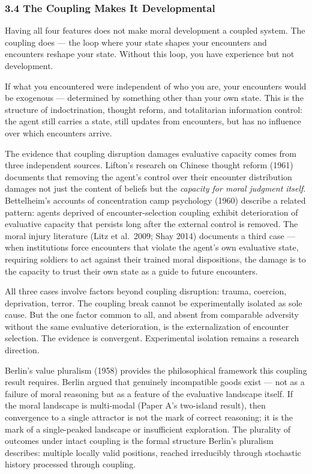 \documentclass[
]{article}
\begin{document}
\subsubsection{3.4 The Coupling Makes It
Developmental}\label{the-coupling-makes-it-developmental}

Having all four features does not make moral development a coupled
system. The coupling does --- the loop where your state shapes your
encounters and encounters reshape your state. Without this loop, you
have experience but not development.

If what you encountered were independent of who you are, your encounters
would be exogenous --- determined by something other than your own
state. This is the structure of indoctrination, thought reform, and
totalitarian information control: the agent still carries a state, still
updates from encounters, but has no influence over which encounters
arrive.

The evidence that coupling disruption damages evaluative capacity comes
from three independent sources. Lifton's research on Chinese thought
reform (1961) documents that removing the agent's control over their
encounter distribution damages not just the content of beliefs but the
\emph{capacity for moral judgment itself}. Bettelheim's accounts of
concentration camp psychology (1960) describe a related pattern: agents
deprived of encounter-selection coupling exhibit deterioration of
evaluative capacity that persists long after the external control is
removed. The moral injury literature (Litz et al.~2009; Shay 2014)
documents a third case --- when institutions force encounters that
violate the agent's own evaluative state, requiring soldiers to act
against their trained moral dispositions, the damage is to the capacity
to trust their own state as a guide to future encounters.

All three cases involve factors beyond coupling disruption: trauma,
coercion, deprivation, terror. The coupling break cannot be
experimentally isolated as sole cause. But the one factor common to all,
and absent from comparable adversity without the same evaluative
deterioration, is the externalization of encounter selection. The
evidence is convergent. Experimental isolation remains a research
direction.

Berlin's value pluralism (1958) provides the philosophical framework
this coupling result requires. Berlin argued that genuinely incompatible
goods exist --- not as a failure of moral reasoning but as a feature of
the evaluative landscape itself. If the moral landscape is multi-modal
(Paper A's two-island result), then convergence to a single attractor is
not the mark of correct reasoning; it is the mark of a single-peaked
landscape or insufficient exploration. The plurality of outcomes under
intact coupling is the formal structure Berlin's pluralism describes:
multiple locally valid positions, reached irreducibly through stochastic
history processed through coupling.
\end{document}
